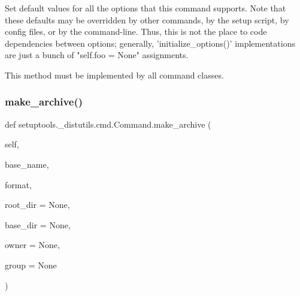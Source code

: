 \begin{DoxyVerb}Set default values for all the options that this command
supports.  Note that these defaults may be overridden by other
commands, by the setup script, by config files, or by the
command-line.  Thus, this is not the place to code dependencies
between options; generally, 'initialize_options()' implementations
are just a bunch of "self.foo = None" assignments.

This method must be implemented by all command classes.
\end{DoxyVerb}
 \mbox{\label{classsetuptools_1_1__distutils_1_1cmd_1_1Command_a6acb52ef1168085b9eb6a02d739089e3}} 
\subsubsection{\texorpdfstring{make\+\_\+archive()}{make\_archive()}}
{\footnotesize\ttfamily def setuptools.\+\_\+distutils.\+cmd.\+Command.\+make\+\_\+archive (\begin{DoxyParamCaption}\item[{}]{self,  }\item[{}]{base\+\_\+name,  }\item[{}]{format,  }\item[{}]{root\+\_\+dir = {\ttfamily None},  }\item[{}]{base\+\_\+dir = {\ttfamily None},  }\item[{}]{owner = {\ttfamily None},  }\item[{}]{group = {\ttfamily None} }\end{DoxyParamCaption})}

\mbox{\label{classsetuptools_1_1__distutils_1_1cmd_1_1Command_ab3d3a89fe0d6c0aa4d8b92ef5c2dce66}} 
